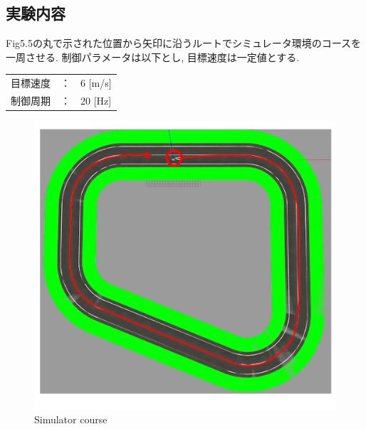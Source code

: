\subsection{実験内容}
Fig5.5の丸で示された位置から矢印に沿うルートでシミュレータ環境のコースを一周させる.
制御パラメータは以下とし, 目標速度は一定値とする.

\begin{table}[H]
     \begin{tabular}{lcl}
         $目標速度$ & ： & 6 [m/s] \\
         $制御周期$ & ： & 20 [Hz] \\
     \end{tabular}
\end{table}

\begin{figure}[H]
  \centering
 \includegraphics[keepaspectratio, scale=0.6]
      {images/simulatorpath.png}
 \caption{Simulator course}
 \label{fig:simulator}
\end{figure}


